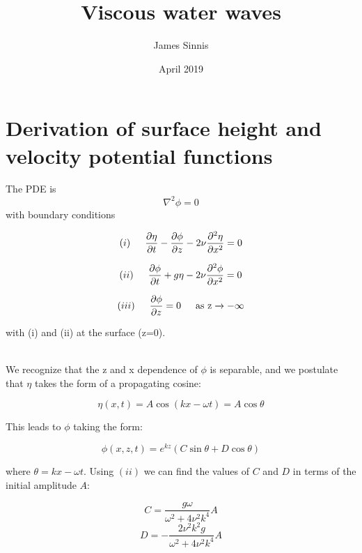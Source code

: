 \documentclass{article}
\title{Viscous water waves}
\author{James Sinnis}
\date{April 2019}
\begin{document}
\maketitle

\section{Derivation of surface height and velocity potential functions}

The PDE is $$\nabla ^2\phi = 0$$
with boundary conditions

$$(i) \indent \frac{\partial{\eta}}{\partial{t}} - \frac{\partial{\phi}}{\partial{z}} - 2\nu \frac{\partial^2{\eta}}{\partial{x^2}} = 0$$

$$(ii) \indent \pdv{\phi}{t} + g\eta -2\nu \pdv[2]{\phi}{x}=0$$

$$(iii)\indent \pdv{\phi}{z} = 0 \text{\indent as z} \xrightarrow{} -\infty$$

\noindent with (i) and (ii) at the surface (z=0).

\\\vspace{2mm} We recognize that the z and x dependence of $\phi$ is separable, and we postulate that $\eta$ takes the form of a propagating cosine:

$$\eta(x,t) = A\cos{(kx - \omega t)} = A\cos{\theta}$$

This leads to $\phi$ taking the form:

$$\phi(x,z,t) = e^{kz} (C\sin{\theta} + D\cos{\theta})$$

where $\theta = kx - \omega t$. Using $(ii)$ we can find the values of $C$ and $D$ in terms of the initial amplitude $A$:

$$C = \frac{g\omega}{\omega^2+4\nu^2k^4} A$$
$$D = -\frac{2\nu^2k^2g}{\omega^2+4\nu^2k^4} A$$
\end{document}
